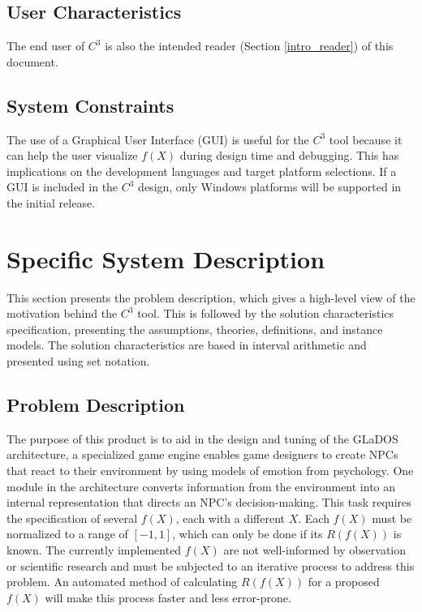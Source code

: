 \documentclass[12pt]{article}
\newcommand{\prognameAbbrv}{$C^{3}$}
\begin{document}
\subsection{User Characteristics} \label{SecUserCharacteristics}
The end user of \prognameAbbrv{} is also the intended reader (Section 
\ref{intro_reader}) of this document.

\subsection{System Constraints}
\label{sec_sysconstraints}
The use of a Graphical User Interface (GUI) is useful for the \prognameAbbrv{} 
tool because it can help the user visualize $f(X)$ during design time and 
debugging. This has implications on the development languages and target 
platform selections. If a GUI is included in the \prognameAbbrv{} design, only 
Windows platforms will be supported in the initial release.

\section{Specific System Description}
\label{specific}
This section presents the problem description, which gives a high-level
view of the motivation behind the \prognameAbbrv{} tool. This is followed by 
the solution characteristics specification, presenting the assumptions, 
theories, definitions, and instance models. The solution characteristics are 
based in interval arithmetic and presented using set notation. 

\subsection{Problem Description} 
\label{Sec_pd}
The purpose of this product is to aid in the design and tuning of the GLaDOS 
architecture, a specialized game engine enables game designers to create NPCs 
that react to their environment by using models of emotion from psychology. One 
module in the architecture converts information from the environment into an 
internal representation that directs an NPC's decision-making. This task 
requires the specification of several $f(X)$, each with a different $X$. Each 
$f(X)$ must be normalized to a range of $[-1,1]$, which can only be 
done if its $R(f(X))$ is known. The currently implemented $f(X)$ are not 
well-informed by observation or scientific research and must be subjected to an 
iterative process to address this problem. An automated method of calculating 
$R(f(X))$ for a proposed $f(X)$ will make this process faster and less 
error-prone.
\end{document}
